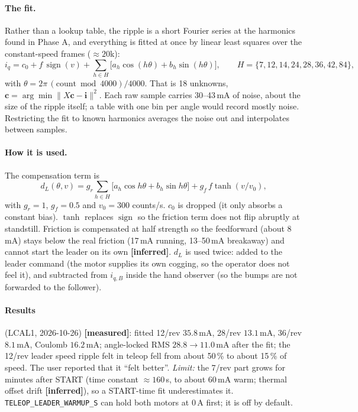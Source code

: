 \documentclass[11pt,a4paper]{article}
\newcommand{\iq}{i_q}
\newcommand{\mA}{\,\mathrm{mA}}
\newcommand{\measured}{\textcolor{teal!70!black}{\textbf{[measured]}}}
\newcommand{\inferred}{\textcolor{orange!80!black}{\textbf{[inferred]}}}
\begin{document}
\paragraph{The fit.} Rather than a lookup table, the ripple is a short
Fourier series at the harmonics found in Phase A, and everything is fitted
at once by linear least squares over the constant-speed frames
($\approx 20$k):
\begin{equation}
  \iq = c_0 + f\,\operatorname{sign}(v) + \sum_{h\in H}
        \bigl[a_h\cos(h\theta) + b_h\sin(h\theta)\bigr],
  \qquad H = \{7,12,14,24,28,36,42,84\},
\end{equation}
with $\theta = 2\pi\,(\text{count} \bmod 4000)/4000$. That is 18 unknowns,
$\mathbf c = \arg\min\|X\mathbf c - \mathbf i\|^2$. Each raw sample carries
30--43\,mA of noise, about the size of the ripple itself; a table with one
bin per angle would record mostly noise. Restricting the fit to known
harmonics averages the noise out and interpolates between samples.

\paragraph{How it is used.} The compensation term is
\begin{equation}
  d_L(\theta, v) = g_r\sum_{h\in H}\bigl[a_h\cos h\theta + b_h\sin h\theta\bigr]
                 + g_f\,f\tanh(v/v_0),
\end{equation}
with $g_r = 1$, $g_f = 0.5$ and $v_0 = 300$ counts/s. $c_0$ is dropped (it only absorbs a constant bias). $\tanh$ replaces
$\operatorname{sign}$ so the friction term does not flip abruptly at
standstill. Friction is compensated at half strength so the feedforward
(about 8\,mA) stays below the real friction (17\,mA running, 13--50\,mA
breakaway) and cannot start the leader on its own \inferred. $d_L$ is used
twice: added to the leader command (the motor supplies its own cogging, so
the operator does not feel it), and subtracted from $i_{q,B}$ inside the
hand observer (so the bumps are not forwarded to the follower).

\paragraph{Results} (LCAL1, 2026-10-26) \measured: fitted 12/rev
$35.8\mA$, 28/rev $13.1\mA$, 36/rev $8.1\mA$, Coulomb $16.2\mA$;
angle-locked RMS $28.8 \to 11.0\mA$ after the fit; the 12/rev leader speed
ripple felt in teleop fell from about 50\,\% to about 15\,\% of speed. The
user reported that it ``felt better''. \emph{Limit:} the 7/rev part grows for
minutes after START (time constant $\approx 160$\,s, to about 60\,mA warm;
thermal offset drift \inferred), so a START-time fit underestimates it.
\texttt{TELEOP\_LEADER\_WARMUP\_S} can hold both motors at 0\,A first; it
is off by default.
\end{document}
